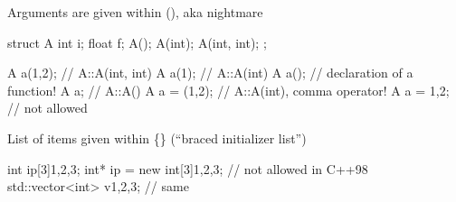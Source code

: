 \begin{frame}[fragile]
  \begin{block}{Arguments are given within (), aka  nightmare}
    \begin{cppcode*}{}
      struct A {
        int i;
        float f;
        A();
        A(int);
        A(int, int);
      };

      A a(1,2);    // A::A(int, int)
      A a(1);      // A::A(int)
      A a();       // declaration of a function!
      A a;         // A::A()
      A a = (1,2); // A::A(int), comma operator!
      A a = {1,2}; // not allowed
    \end{cppcode*}
  \end{block}
\end{frame}

\begin{frame}[fragile]
  \begin{exampleblock}{List of items given within \{\} (``braced initializer list'')}
    \begin{cppcode*}{}
     int ip[3]{1,2,3};
     int* ip = new int[3]{1,2,3}; // not allowed in C++98
     std::vector<int> v{1,2,3};   // same
    \end{cppcode*}
  \end{exampleblock}
\end{frame}
